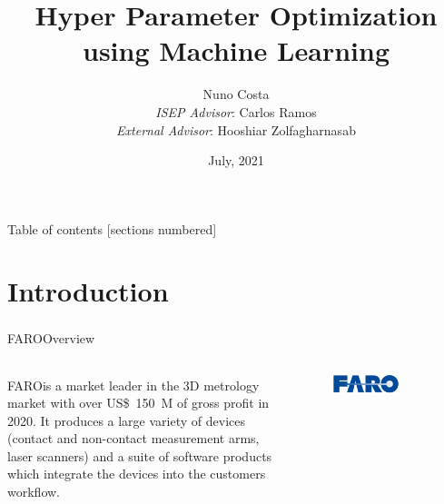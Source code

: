 \documentclass[10pt]{beamer}
\title{Hyper Parameter Optimization \\using Machine Learning}
\date{July, 2021}
\author{{Nuno Costa} \\
{\textit{ISEP Advisor}: Carlos Ramos} \\
{\textit{External Advisor}: Hooshiar Zolfagharnasab}}
\institute{Polytechnic of Porto - School of Engineering (ISEP)}
\newcommand{\faro}[0]{FARO\textsuperscript{\textregistered}}
\begin{document}
  \maketitle

  \begin{frame}{Table of contents}
    [sections numbered]
    \tableofcontents%
  \end{frame}

  \section{Introduction}
  \begin{frame}{\faro Overview}
    \begin{columns}
      \begin{column}{0.6\textwidth}
        \faro is a market leader in the 3D metrology market with over \SI{150}[US\$]{M} of gross profit in 2020. It produces a large variety of devices (contact and non-contact measurement arms, laser scanners) and a suite of software products which integrate the devices into the customers workflow.
      \end{column}
      \begin{column}{0.5\textwidth}
        \begin{figure}[r]
        \centering
        \includegraphics[width=0.7\textwidth]{images/faro_logo.png}
        \end{figure}
      \end{column}
    \end{columns}
  \end{frame}
\end{document}
